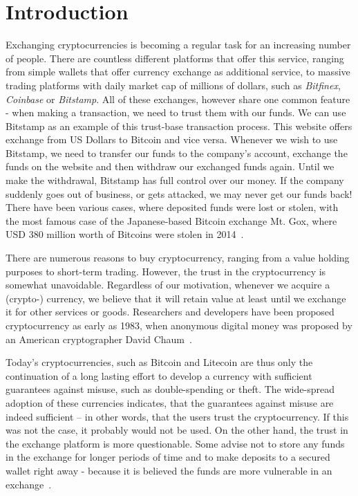 \section{Introduction}
% 
Exchanging cryptocurrencies is becoming a regular task for an increasing number of people. There are countless different platforms that offer this service, ranging from simple wallets that offer currency exchange as additional service, to massive trading platforms with daily market cap of millions of dollars, such as \textit{Bitfinex}, \textit{Coinbase} or \textit{Bitstamp}.  All of these exchanges, however share one common feature - when making a transaction, we need to trust them with our funds. We can use Bitstamp as an example of this trust-base transaction process. This website offers exchange from US Dollars to Bitcoin and vice versa. Whenever we wish to use Bitstamp, we need to transfer our funds to the company's account, exchange the funds on the website and then withdraw our exchanged funds again. Until we make the withdrawal, Bitstamp has full control over our money. If the company suddenly goes out of business, or gets attacked, we may never get our funds back! There have been various cases, where deposited funds were lost or stolen, with the most famous case of the Japanese-based Bitcoin exchange Mt. Gox, where USD 380 million worth of Bitcoins were stolen in 2014~\cite{Popper2014ApparentTimes}.

There are numerous reasons to buy cryptocurrency, ranging from a value holding purposes to short-term trading. However, the trust in the cryptocurrency is somewhat unavoidable. Regardless of our motivation, whenever we acquire a (crypto-) currency, we believe that it will retain value at least until we exchange it for other services or goods. Researchers and developers have been proposed cryptocurrency as early as 1983, when anonymous digital money was proposed by an American cryptographer David Chaum~\cite{Chaum1983BlindPayments}. 

Today's cryptocurrencies, such as Bitcoin and Litecoin are thus only the continuation of a long lasting effort to develop a currency with sufficient guarantees against misuse, such as double-spending or theft. The wide-spread adoption of these currencies indicates, that the guarantees against misuse are indeed sufficient -- in other words, that the users trust the cryptocurrency. If this was not the case, it probably would not be used. On the other hand, the trust in the exchange platform is more questionable. Some advise not to store any funds in the exchange for longer periods of time and to make deposits to a secured wallet right away - because it is believed the funds are more vulnerable in an exchange~\cite{McIntosh2018HowScams}.

